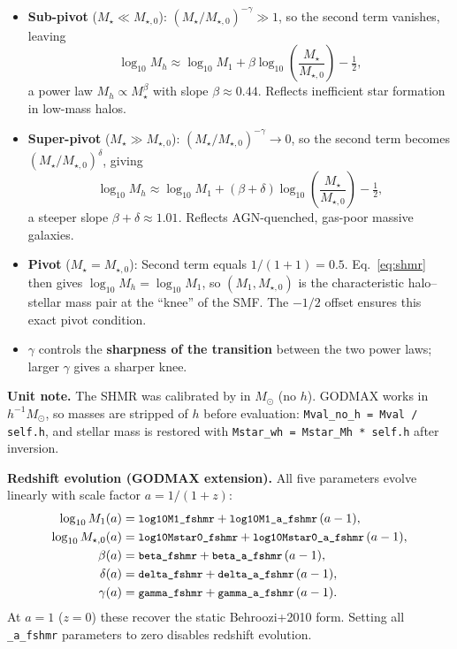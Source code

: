 \documentclass[12pt,a4paper]{article}
\newcommand{\code}[1]{\texttt{\small #1}}
\newcommand{\param}[1]{\texttt{\small #1}}
\begin{document}
\begin{itemize}
  \item \textbf{Sub-pivot} ($M_\star \ll M_{\star,0}$):
    $(M_\star/M_{\star,0})^{-\gamma}\gg 1$, so the second term vanishes,
    leaving
    \[
      \log_{10}M_h \approx \log_{10}M_1 + \beta\log_{10}\!\left(\frac{M_\star}{M_{\star,0}}\right) - \tfrac{1}{2},
    \]
    a power law $M_h\propto M_\star^\beta$ with slope $\beta\approx 0.44$.
    Reflects inefficient star formation in low-mass halos.

  \item \textbf{Super-pivot} ($M_\star \gg M_{\star,0}$):
    $(M_\star/M_{\star,0})^{-\gamma}\to 0$, so the second term becomes
    $(M_\star/M_{\star,0})^\delta$, giving
    \[
      \log_{10}M_h \approx \log_{10}M_1
      + (\beta+\delta)\log_{10}\!\left(\frac{M_\star}{M_{\star,0}}\right) - \tfrac{1}{2},
    \]
    a steeper slope $\beta+\delta\approx 1.01$. Reflects AGN-quenched, gas-poor
    massive galaxies.

  \item \textbf{Pivot} ($M_\star = M_{\star,0}$):
    Second term equals $1/(1+1)=0.5$.
    Eq.~\eqref{eq:shmr} then gives $\log_{10}M_h = \log_{10}M_1$, so
    $(M_1, M_{\star,0})$ is the characteristic halo--stellar mass pair at
    the ``knee'' of the SMF. The $-1/2$ offset ensures this exact pivot
    condition.

  \item $\gamma$ controls the \textbf{sharpness of the transition} between
    the two power laws; larger $\gamma$ gives a sharper knee.
\end{itemize}

\textbf{Unit note.}
The SHMR was calibrated by \cite{Behroozi2010} in $M_\odot$ (no $h$). GODMAX
works in $h^{-1}M_\odot$, so masses are stripped of $h$ before evaluation:
\code{Mval\_no\_h = Mval / self.h}, and stellar mass is restored with
\code{Mstar\_wh = Mstar\_Mh * self.h} after inversion.

\textbf{Redshift evolution (GODMAX extension).}
All five parameters evolve linearly with scale factor $a=1/(1+z)$:
\begin{align}
  \log_{10}M_1(a)        &= \param{log10M1\_fshmr} + \param{log10M1\_a\_fshmr}\,(a-1), \\
  \log_{10}M_{\star,0}(a) &= \param{log10Mstar0\_fshmr} + \param{log10Mstar0\_a\_fshmr}\,(a-1), \\
  \beta(a)  &= \param{beta\_fshmr}  + \param{beta\_a\_fshmr}\,(a-1), \\
  \delta(a) &= \param{delta\_fshmr} + \param{delta\_a\_fshmr}\,(a-1), \\
  \gamma(a) &= \param{gamma\_fshmr} + \param{gamma\_a\_fshmr}\,(a-1).
\end{align}
At $a=1$ ($z=0$) these recover the static Behroozi+2010 form. Setting all
\param{*\_a\_fshmr} parameters to zero disables redshift evolution.
\end{document}
